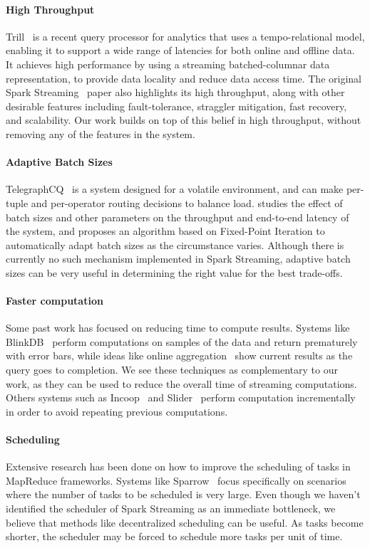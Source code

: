 \paragraph {\bf High Throughput} Trill~\cite{Trill} is a recent query processor for analytics that uses a tempo-relational model, enabling it to support a wide range of latencies for both online and offline data. It achieves high performance by using a streaming batched-columnar data representation, to provide data locality and reduce data access time.
The original Spark Streaming~\cite{SparkStreaming} paper also highlights its high throughput, along with other desirable features including fault-tolerance, straggler mitigation, fast recovery, and scalability. Our work builds on top of this belief in high throughput, without removing any of the features in the system.

\paragraph {\bf Adaptive Batch Sizes} TelegraphCQ~\cite{TelegraphCQ} is a system designed for a volatile environment, and can make per-tuple and per-operator routing decisions to balance load. \cite{das2014adaptive} studies the effect of batch sizes and other parameters on the throughput and end-to-end latency of the system, and proposes an algorithm based on Fixed-Point Iteration to automatically adapt batch sizes as the circumstance varies. Although there is currently no such mechanism implemented in Spark Streaming, adaptive batch sizes can be very useful in determining the right value for the best trade-offs.

\paragraph {\bf Faster computation} Some past work has focused on reducing time to compute results. Systems like BlinkDB~\cite{BlinkDB} perform computations on samples of the data and return prematurely with error bars, while ideas like online aggregation~\cite{OnlineAggregation} show current results as the query goes to completion.
We see these techniques as complementary to our work, as they can be used to reduce the overall time of streaming computations.
Others systems such as Incoop~\cite{Incoop} and Slider~\cite{Slider} perform computation incrementally in order to avoid repeating previous computations. 

\paragraph {\bf Scheduling} Extensive research has been done on how to improve the scheduling of tasks in MapReduce frameworks. 
Systems like Sparrow~\cite{Sparrow} focus specifically on scenarios where the number of tasks to be scheduled is very large.
Even though we haven't identified the scheduler of Spark Streaming as an immediate bottleneck, we believe that methods like decentralized scheduling can be useful. As tasks become shorter, the scheduler may be forced to schedule more tasks per unit of time. 
